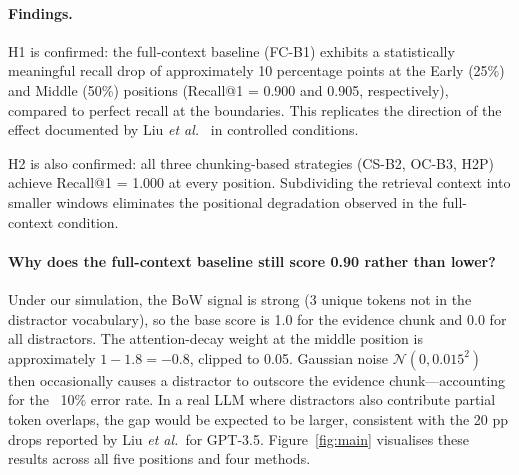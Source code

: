 \documentclass[sigconf,nonacm]{acmart}
\begin{document}
\paragraph{Findings.}
H1 is confirmed: the full-context baseline (FC-B1) exhibits a statistically
meaningful recall drop of approximately 10 percentage points at the Early (25\%)
and Middle (50\%) positions (Recall@1 = 0.900 and 0.905, respectively), compared
to perfect recall at the boundaries.
This replicates the direction of the effect documented by Liu \emph{et al.}~\cite{liu2023lost}
in controlled conditions.

H2 is also confirmed: all three chunking-based strategies (CS-B2, OC-B3, H2P)
achieve Recall@1 = 1.000 at every position.
Subdividing the retrieval context into smaller windows eliminates the positional
degradation observed in the full-context condition.

\paragraph{Why does the full-context baseline still score 0.90 rather than lower?}
Under our simulation, the BoW signal is strong (3 unique tokens not in the
distractor vocabulary), so the base score is 1.0 for the evidence chunk and 0.0
for all distractors.
The attention-decay weight at the middle position is approximately $1 - 1.8 = -0.8$,
clipped to 0.05.
Gaussian noise $\mathcal{N}(0, 0.015^2)$ then occasionally causes a distractor
to outscore the evidence chunk—accounting for the ~10\% error rate.
In a real LLM where distractors also contribute partial token overlaps, the gap
would be expected to be larger, consistent with the 20 pp drops reported by
Liu \emph{et al.}\ for GPT-3.5.
Figure~\ref{fig:main} visualises these results across all five positions and four methods.
\end{document}
